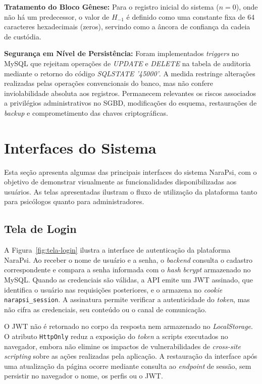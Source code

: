 \textbf{Tratamento do Bloco Gênese:} Para o registro inicial do sistema ($n=0$), onde não há um predecessor, o valor de $H_{-1}$ é definido como uma constante fixa de 64 caracteres hexadecimais (zeros), servindo como a âncora de confiança da cadeia de custódia.

\textbf{Segurança em Nível de Persistência:} Foram implementados \textit{triggers} no MySQL que rejeitam operações de \textit{UPDATE} e \textit{DELETE} na tabela de auditoria mediante o retorno do código \textit{SQLSTATE '45000'}. A medida restringe alterações realizadas pelas operações convencionais do banco, mas não confere inviolabilidade absoluta aos registros. Permanecem relevantes os riscos associados a privilégios administrativos no SGBD, modificações do esquema, restaurações de \textit{backup} e comprometimento das chaves criptográficas.

\section{Interfaces do Sistema}

Esta seção apresenta algumas das principais interfaces do sistema NaraPsi, com o objetivo de demonstrar visualmente as funcionalidades disponibilizadas aos usuários. As telas apresentadas ilustram o fluxo de utilização da plataforma tanto para psicólogos quanto para administradores.

\subsection{Tela de Login}

A Figura~\ref{fig:tela-login} ilustra a interface de autenticação da plataforma NaraPsi. Ao receber o nome de usuário e a senha, o \textit{backend} consulta o cadastro correspondente e compara a senha informada com o \textit{hash} \textit{bcrypt} armazenado no MySQL. Quando as credenciais são válidas, a API emite um JWT assinado, que identifica o usuário nas requisições posteriores, e o armazena no \textit{cookie} \texttt{narapsi\_session}. A assinatura permite verificar a autenticidade do \textit{token}, mas não cifra as credenciais, seu conteúdo ou o canal de comunicação.

O JWT não é retornado no corpo da resposta nem armazenado no \textit{LocalStorage}. O atributo \texttt{HttpOnly} reduz a exposição do \textit{token} a scripts executados no navegador, embora não elimine os impactos de vulnerabilidades de \textit{cross-site scripting} sobre as ações realizadas pela aplicação. A restauração da interface após uma atualização da página ocorre mediante consulta ao \textit{endpoint} de sessão, sem persistir no navegador o nome, os perfis ou o JWT.

